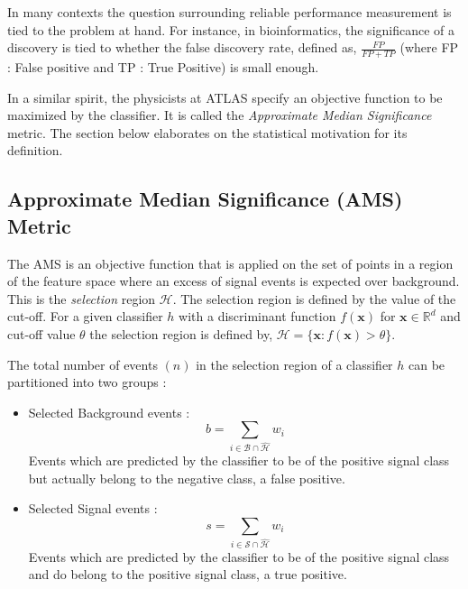 \documentclass[final,3p,times,twocolumn]{elsarticle}
\begin{document}
In many contexts the question surrounding reliable performance measurement is tied to the problem at hand. For instance, in bioinformatics, the significance of a discovery is tied to whether the false discovery rate, defined as, $\frac{\displaystyle FP}{\displaystyle FP+TP}$ (where FP : False positive and TP : True Positive) is small enough. 

In a similar spirit, the physicists at ATLAS specify an objective function to be maximized by the classifier. It is called the \textit{Approximate Median Significance} metric. The section below elaborates on the statistical motivation for its definition.

\subsection{Approximate Median Significance (AMS) Metric}
\label{ams}

The AMS is an objective function that is applied on the set of points in a region of the feature space where an excess of signal events is expected over background. This is the \textit{selection} region $\mathcal{H}$. The selection region is defined by the value of the cut-off. For a given classifier $h$ with a discriminant function $f(\textbf{x})$ for $\textbf{x} \in \mathbb{R}^d$ and cut-off value $\theta$ the selection region is defined by, $ \mathcal{H} = \{\textbf{x} : f(\textbf{x}) > \theta \}$.

The total number of events $(n)$ in the selection region of a classifier $h$ can be partitioned into two groups :

\begin{itemize}
\item{Selected Background events : \begin{displaymath} b =\sum_{i \in \mathcal{B}\cap\hat{\mathcal{H}}} w_{i} \end{displaymath} Events which are predicted by the classifier to be of the positive signal class but actually belong to the negative class, a false positive.}
\item{Selected Signal events : \begin{displaymath} s =\sum_{i \in \mathcal{S}\cap\hat{\mathcal{H}}} w_{i} \end{displaymath} Events which are predicted by the classifier to be of the positive signal class and do belong to the positive signal class, a true positive.}
\end{itemize}
\end{document}

